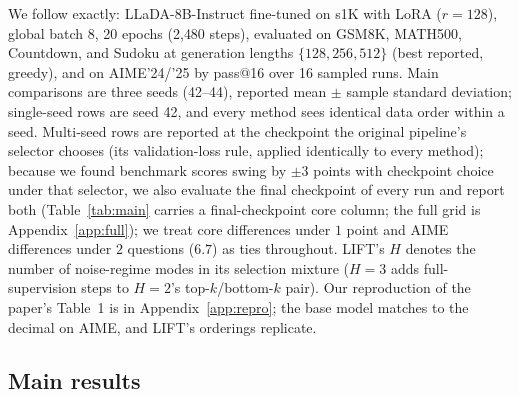 \documentclass{article} %
\begin{document}
We follow \citet{lift2026} exactly: LLaDA-8B-Instruct fine-tuned on s1K \citep{muennighoff2025s1} with LoRA ($r{=}128$), global batch 8, 20 epochs (2{,}480 steps), evaluated on GSM8K, MATH500, Countdown, and Sudoku at generation lengths $\{128, 256, 512\}$ (best reported, greedy), and on AIME'24/'25 by pass@16 over 16 sampled runs. Main comparisons are three seeds (42--44), reported mean $\pm$ sample standard deviation; single-seed rows are seed 42, and every method sees identical data order within a seed. Multi-seed rows are reported at the checkpoint the original pipeline's selector chooses (its validation-loss rule, applied identically to every method); because we found benchmark scores swing by $\pm 3$ points with checkpoint choice under that selector, we also evaluate the final checkpoint of every run and report both (Table~\ref{tab:main} carries a final-checkpoint core column; the full grid is Appendix~\ref{app:full}); we treat core differences under $1$ point and AIME differences under $2$ questions ($6.7$) as ties throughout. LIFT's $H$ denotes the number of noise-regime modes in its selection mixture ($H{=}3$ adds full-supervision steps to $H{=}2$'s top-$k$/bottom-$k$ pair). Our reproduction of the paper's Table~1 is in Appendix~\ref{app:repro}; the base model matches to the decimal on AIME, and LIFT's orderings replicate.

\subsection{Main results}
\end{document}
